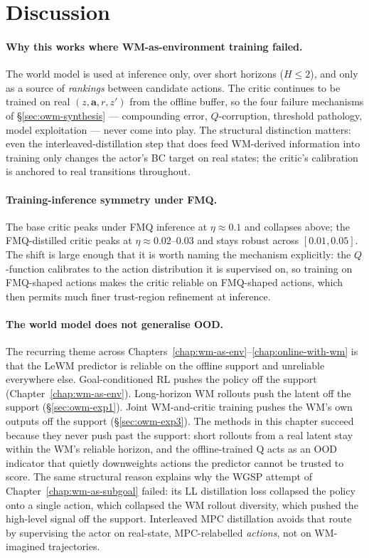 \section{Discussion}
\label{sec:owm-discussion}

\paragraph{Why this works where WM-as-environment training failed.}
The world model is used at inference only, over short horizons
($H \le 2$), and only as a source of \emph{rankings} between candidate
actions. The critic continues to be trained on real
$(z, \mathbf{a}, r, z')$ from the offline buffer, so the four failure
mechanisms of §\ref{sec:owm-synthesis} --- compounding error,
$Q$-corruption, threshold pathology, model exploitation --- never come
into play. The structural distinction matters: even the
interleaved-distillation step that does feed WM-derived information
into training only changes the actor's BC target on real states; the
critic's calibration is anchored to real transitions throughout.

\paragraph{Training-inference symmetry under FMQ.}
The base critic peaks under FMQ inference at $\eta \approx 0.1$ and
collapses above; the FMQ-distilled critic peaks at $\eta \approx
0.02$--$0.03$ and stays robust across $[0.01, 0.05]$. The shift is
large enough that it is worth naming the mechanism explicitly: the
$Q$-function calibrates to the action distribution it is supervised
on, so training on FMQ-shaped actions makes the critic reliable on
FMQ-shaped actions, which then permits much finer trust-region
refinement at inference.

\paragraph{The world model does not generalise OOD.}
The recurring theme across Chapters~\ref{chap:wm-as-env}--\ref{chap:online-with-wm}
is that the LeWM predictor is reliable on the offline support and
unreliable everywhere else. Goal-conditioned RL pushes the policy off
the support (Chapter~\ref{chap:wm-as-env}). Long-horizon WM rollouts
push the latent off the support (§\ref{sec:owm-exp1}). Joint
WM-and-critic training pushes the WM's own outputs off the support
(§\ref{sec:owm-exp3}). The methods in this chapter succeed because
they never push past the support: short rollouts from a real latent
stay within the WM's reliable horizon, and the offline-trained Q
acts as an OOD indicator that quietly downweights actions the
predictor cannot be trusted to score. The same structural reason
explains why the WGSP attempt of Chapter~\ref{chap:wm-as-subgoal}
failed: its LL distillation loss collapsed the policy onto a single
action, which collapsed the WM rollout diversity, which pushed the
high-level signal off the support. Interleaved MPC distillation
avoids that route by supervising the actor on real-state, MPC-relabelled
\emph{actions}, not on WM-imagined trajectories.

